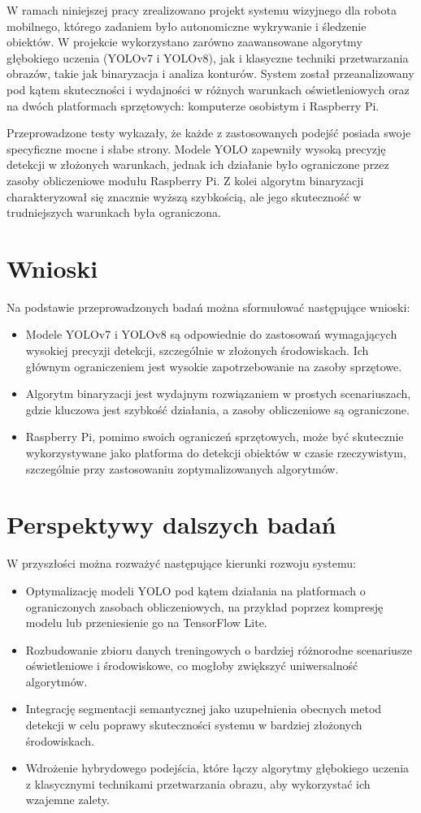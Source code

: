 \documentclass[a4paper,twoside,12pt]{book}
\begin{document}
W ramach niniejszej pracy zrealizowano projekt systemu wizyjnego dla robota mobilnego, którego zadaniem było autonomiczne wykrywanie i śledzenie obiektów. W projekcie wykorzystano zarówno zaawansowane algorytmy głębokiego uczenia (YOLOv7 i YOLOv8), jak i klasyczne techniki przetwarzania obrazów, takie jak binaryzacja i analiza konturów. System został przeanalizowany pod kątem skuteczności i wydajności w różnych warunkach oświetleniowych oraz na dwóch platformach sprzętowych: komputerze osobistym i Raspberry Pi.

Przeprowadzone testy wykazały, że każde z zastosowanych podejść posiada swoje specyficzne mocne i słabe strony. Modele YOLO zapewniły wysoką precyzję detekcji w złożonych warunkach, jednak ich działanie było ograniczone przez zasoby obliczeniowe modułu Raspberry Pi. Z kolei algorytm binaryzacji charakteryzował się znacznie wyższą szybkością, ale jego skuteczność w trudniejszych warunkach była ograniczona.

\section{Wnioski}
Na podstawie przeprowadzonych badań można sformułować następujące wnioski:
\begin{itemize}
    \item Modele YOLOv7 i YOLOv8 są odpowiednie do zastosowań wymagających wysokiej precyzji detekcji, szczególnie w złożonych środowiskach. Ich głównym ograniczeniem jest wysokie zapotrzebowanie na zasoby sprzętowe.
    \item Algorytm binaryzacji jest wydajnym rozwiązaniem w prostych scenariuszach, gdzie kluczowa jest szybkość działania, a zasoby obliczeniowe są ograniczone.
    \item Raspberry Pi, pomimo swoich ograniczeń sprzętowych, może być skutecznie wykorzystywane jako platforma do detekcji obiektów w czasie rzeczywistym, szczególnie przy zastosowaniu zoptymalizowanych algorytmów.
\end{itemize}

\section{Perspektywy dalszych badań}
W przyszłości można rozważyć następujące kierunki rozwoju systemu:
\begin{itemize}
    \item Optymalizację modeli YOLO pod kątem działania na platformach o ograniczonych zasobach obliczeniowych, na przykład poprzez kompresję modelu lub przeniesienie go na TensorFlow Lite.
    \item Rozbudowanie zbioru danych treningowych o bardziej różnorodne scenariusze oświetleniowe i środowiskowe, co mogłoby zwiększyć uniwersalność algorytmów.
    \item Integrację segmentacji semantycznej jako uzupełnienia obecnych metod detekcji w celu poprawy skuteczności systemu w bardziej złożonych środowiskach.
    \item Wdrożenie hybrydowego podejścia, które łączy algorytmy głębokiego uczenia z klasycznymi technikami przetwarzania obrazu, aby wykorzystać ich wzajemne zalety.
\end{itemize}
\end{document}
